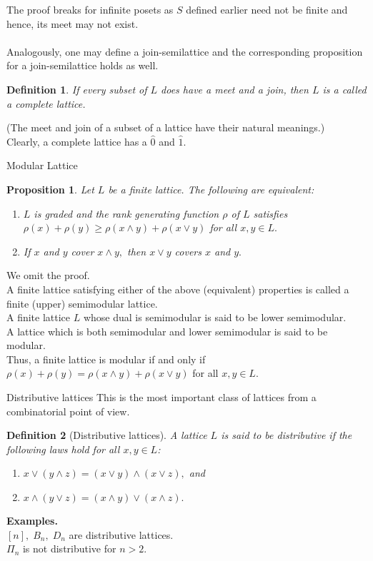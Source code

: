 \documentclass[handout, aspectratio=169]{beamer}
\newtheorem{defn}{Definition}
\newtheorem{prop}{Proposition}
\begin{document}
\begin{frame}{}
	The proof breaks for infinite posets as $S$ defined earlier need not be finite and hence, its meet may not exist. \\~\\
	Analogously, one may define a join-semilattice and the corresponding proposition for a join-semilattice holds as well.
	\begin{defn}
		If every subset of $L$ does have a meet and a join, then $L$ is a called a complete lattice.
	\end{defn}
	(The meet and join of a subset of a lattice have their natural meanings.)\\
	Clearly, a complete lattice has a $\hat{0}$ and $\hat{1}.$
\end{frame}
\begin{frame}{Modular Lattice}
	\begin{prop}
		Let $L$ be a finite lattice. The following are equivalent:
		\begin{enumerate} 
			\item $L$ is graded and the rank generating function $\rho$ of $L$ satisfies $\rho(x) + \rho(y) \ge \rho(x\wedge y) + \rho(x\vee y)$ for all $x, y \in L.$
			\item If $x$ and $y$ cover $x\wedge y,$ then $x\vee y$ covers $x$ and $y.$
		\end{enumerate}
	\end{prop}
	We omit the proof.\\
	A finite lattice satisfying either of the above (equivalent) properties is called a finite (upper) semimodular lattice.\\
	A finite lattice $L$ whose dual is semimodular is said to be lower semimodular.\\
	A lattice which is both semimodular and lower semimodular is said to be modular.\\
	Thus, a finite lattice is modular if and only if $\rho(x) + \rho(y) = \rho(x\wedge y) + \rho(x\vee y)$ for all $x, y \in L.$\\
\end{frame}	
\begin{frame}{Distributive lattices}
	This is the most important class of lattices from a combinatorial point of view.
	\begin{defn}[Distributive lattices]
		A lattice $L$ is said to be distributive if the following laws hold for all $x, y \in L$:
		\begin{enumerate} 
			\item $x \vee(y \wedge z)=(x \vee y) \wedge(x \vee z),$ and
			\item $x \wedge(y \vee z)=(x \wedge y) \vee(x \wedge z).$
		\end{enumerate}
	\end{defn}
	\textbf{Examples.}\\
	$[n],\;B_n,\;D_n$ are distributive lattices.\\
	$\Pi_n$ is not distributive for $n > 2.$
\end{frame}
\end{document}
